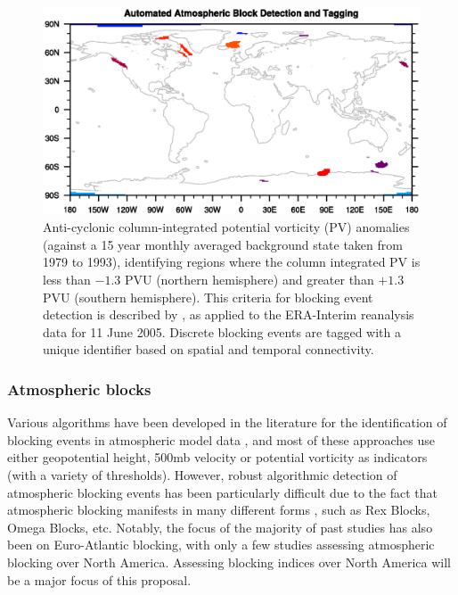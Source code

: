 \documentclass[11pt]{article}
\begin{document}
\begin{figure}[p]
\begin{center}
\includegraphics[trim=0.5cm 4.5cm 1cm 4.5cm, clip=true, width=5in]{blob_plot}
\end{center}
\caption{Anti-cyclonic column-integrated potential vorticity (PV) anomalies (against a 15 year monthly averaged background state taken from 1979 to 1993), identifying regions where the column integrated PV is less than $-1.3$ PVU (northern hemisphere) and greater than $+1.3$ PVU (southern hemisphere).  This criteria for blocking event detection is described by \cite{scherrer2006two}, as applied to the ERA-Interim reanalysis data for 11 June 2005.  Discrete blocking events are tagged with a unique identifier based on spatial and temporal connectivity.} \label{fig:BlockingDetection}
\end{figure}

\subsubsection{Atmospheric blocks}

Various algorithms have been developed in the literature for the identification of blocking events in atmospheric model data \citep{tibaldi1990operational, wiedenmann2002climatology, pelly2003new, schwierz2004perspicacious, scherrer2006two, tyrlis2008aspects, barriopedro2010application, barnes2012methodology}, and most of these approaches use either geopotential height, 500mb velocity or potential vorticity as indicators (with a variety of thresholds).  However, robust algorithmic detection of atmospheric blocking events has been particularly difficult due to the fact that atmospheric blocking manifests in many different forms \citep{haby2008blocking}, such as Rex Blocks, Omega Blocks, etc.  Notably, the focus of the majority of past studies has also been on Euro-Atlantic blocking, with only a few studies assessing atmospheric blocking over North America.  Assessing blocking indices over North America will be a major focus of this proposal.
\end{document}
